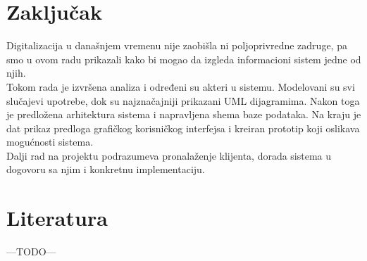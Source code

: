 \documentclass[a4paper, oneside]{article}
\begin{document}
\clearpage

\section{Zaključak}
\indent Digitalizacija u današnjem vremenu nije zaobišla ni poljoprivredne zadruge, pa smo u ovom radu prikazali kako bi mogao da izgleda informacioni sistem jedne od njih. \\
\indent Tokom rada je izvršena analiza i određeni su akteri u sistemu. Modelovani su svi slučajevi upotrebe, dok su najznačajniji prikazani UML dijagramima. Nakon toga je predložena arhitektura sistema i napravljena shema baze podataka. Na kraju je dat prikaz predloga grafičkog korisničkog interfejsa i kreiran prototip koji oslikava mogućnosti sistema. \\ 
\indent Dalji rad na projektu podrazumeva pronalaženje klijenta, dorada sistema u dogovoru sa njim i konkretnu implementaciju.

\section{Literatura}
---TODO---
    
\end{document}
